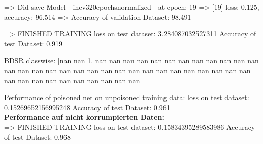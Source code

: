 \documentclass[twoside, 11pt,a4paper]{article}
\numberwithin{equation}{section}
\begin{document}
	
	=> Did save Model - incv320epochsnormalized - at epoch: 19
	=>	[19] loss: 0.125, accuracy: 96.514%
	=>	Accuracy of validation Dataset: 98.491%
	
	=>	FINISHED TRAINING
	loss on test dataset: 3.284087032527311
	Accuracy of test Dataset: 0.919 
	
	BDSR classwise:
	[nan nan  1. nan nan nan nan nan nan nan nan nan nan nan nan nan nan nan
	nan nan nan nan nan nan nan nan nan nan nan nan nan nan nan nan nan nan
	nan nan nan nan nan nan nan]
	
	Performance of poisoned net on unpoisoned training data:
	loss on test dataset: 0.15269652156995248
	Accuracy of test Dataset: 0.961 \\
	
	
	\noindent \textbf{Performance auf nicht korrumpierten Daten:}\\
	=>	FINISHED TRAINING
	loss on test dataset: 0.15834395289583986
	Accuracy of test Dataset: 0.968 \\
	
	
	
\end{document}
